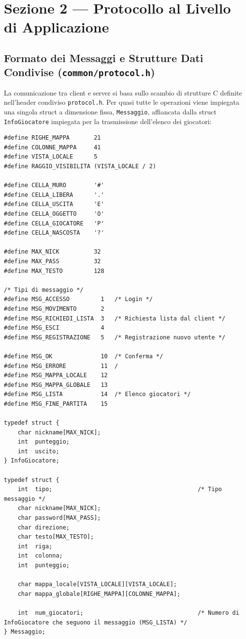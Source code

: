 \documentclass[11pt,a4paper]{article}
\begin{document}
\section{Sezione 2 --- Protocollo al Livello di Applicazione}

\subsection{Formato dei Messaggi e Strutture Dati Condivise (\texttt{common/protocol.h})}

La comunicazione tra client e server si basa sullo scambio di strutture C definite nell'header condiviso \texttt{protocol.h}. Per quasi tutte le operazioni viene impiegata una singola struct a dimensione fissa, \texttt{Messaggio}, affiancata dalla struct \texttt{InfoGiocatore} impiegata per la trasmissione dell'elenco dei giocatori:

\begin{lstlisting}[style=cstyle]
#define RIGHE_MAPPA       21
#define COLONNE_MAPPA     41
#define VISTA_LOCALE      5
#define RAGGIO_VISIBILITA (VISTA_LOCALE / 2)

#define CELLA_MURO        '#'
#define CELLA_LIBERA      '.'
#define CELLA_USCITA      'E'
#define CELLA_OGGETTO     'O'
#define CELLA_GIOCATORE   'P'
#define CELLA_NASCOSTA    '?'

#define MAX_NICK          32
#define MAX_PASS          32
#define MAX_TESTO         128

/* Tipi di messaggio */
#define MSG_ACCESSO         1   /* Login */
#define MSG_MOVIMENTO       2   
#define MSG_RICHIEDI_LISTA  3   /* Richiesta lista dal client */
#define MSG_ESCI            4   
#define MSG_REGISTRAZIONE   5   /* Registrazione nuovo utente */

#define MSG_OK              10  /* Conferma */
#define MSG_ERRORE          11  /
#define MSG_MAPPA_LOCALE    12  
#define MSG_MAPPA_GLOBALE   13  
#define MSG_LISTA           14  /* Elenco giocatori */
#define MSG_FINE_PARTITA    15  

typedef struct {
    char nickname[MAX_NICK];
    int  punteggio;
    int  uscito;
} InfoGiocatore;

typedef struct {
    int  tipo;                                          /* Tipo messaggio */
    char nickname[MAX_NICK];                           
    char password[MAX_PASS];                           
    char direzione;                                    
    char testo[MAX_TESTO];                             
    int  riga;                                 
    int  colonna;                                   
    int  punteggio;                                     
    
    char mappa_locale[VISTA_LOCALE][VISTA_LOCALE];      
    char mappa_globale[RIGHE_MAPPA][COLONNE_MAPPA];    
    
    int  num_giocatori;                                 /* Numero di InfoGiocatore che seguono il messaggio (MSG_LISTA) */
} Messaggio;
\end{lstlisting}
\end{document}
